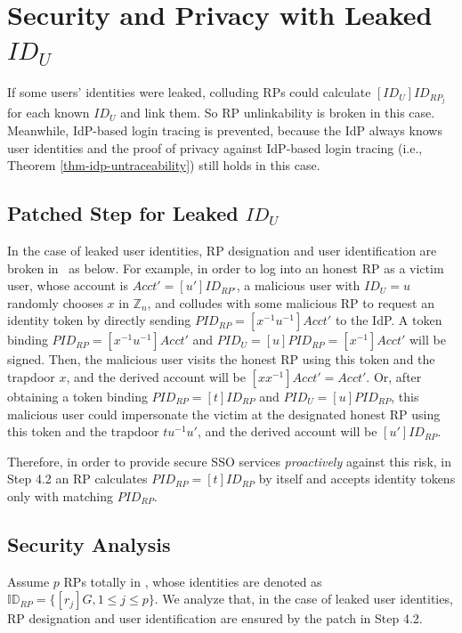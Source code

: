 \appendix

\section{Security and Privacy with Leaked $ID_U$}
\label{sp-leak-uid}

If some users' identities were leaked,
    colluding RPs could calculate $[ID_U]ID_{RP_j}$ for each known $ID_U$ and link them.
So RP unlinkability is broken in this case.
Meanwhile, IdP-based login tracing is prevented,
    because the IdP always knows user identities and the proof of privacy against IdP-based login tracing (i.e., Theorem \ref{thm-idp-untraceability}) still holds in this case.

\subsection{Patched Step for Leaked $ID_U$}
In the case of leaked user identities,
RP designation and user identification are broken in \usso\ as below.
For example, in order to log into an honest RP as a victim user, whose account is $Acct' = [u']ID_{RP'}$,
    a malicious user with $ID_U = u$ randomly chooses $x$ in $\mathbb{Z}_n$,
    and colludes with some malicious RP to request an identity token by directly sending $PID_{RP} = [x^{-1}u^{-1}]Acct'$ to the IdP.
A token binding $PID_{RP} = [x^{-1}u^{-1}]Acct'$ and $PID_U = [u]PID_{RP} = [x^{-1}]Acct'$ will be signed.
Then, the malicious user visits the honest RP using this token and the trapdoor $x$,
    and the derived account will be $[xx^{-1}]Acct'=Acct'$.
Or, after obtaining a token binding $PID_{RP} = [t]ID_{RP}$ and $PID_U = [u]PID_{RP}$,
    this malicious user could impersonate the victim at the designated honest RP
     using this token and the trapdoor $tu^{-1}u'$, and the derived account will be $[u']ID_{RP}$.

Therefore, in order to provide secure SSO services \emph{proactively} against this risk,
     in Step 4.2 an RP calculates $PID_{RP} = [t]ID_{RP}$ by itself and
        accepts identity tokens only with matching $PID_{RP}$.

\subsection{Security Analysis}
\label{proof-rp-collision}

Assume $p$ RPs totally in \usso,
    whose identities are denoted as $\mathbb{ID}_{RP} = \{[r_{j}]G, 1 \leq j \leq p\}$.
We analyze that, in the case of leaked user identities,
    RP designation and user identification are ensured by the patch in Step 4.2.


